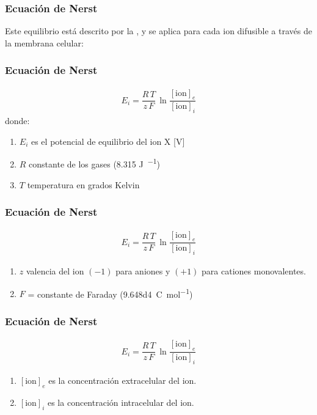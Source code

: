 \documentclass[14pt]{beamer}
\begin{document}
\begin{frame}
\frametitle{Ecuación de Nerst}
Este equilibrio está descrito por la , y se aplica para cada ion difusible a través de la membrana celular:
\end{frame}
\begin{frame}
\frametitle{Ecuación de Nerst}
\vspace*{-1cm}
\begin{align*}
E_{i} = \dfrac{R \, T}{z \, F} \, \ln \dfrac{\left[ \text{ion} \right]_{e}}{\left[ \text{ion} \right]_{i}}
\end{align*}
donde:
\begin{enumerate}[<+->]
\item $E_{i}$ es el potencial de equilibrio del ion X [V]
\item $R$ constante de los gases (\num{8.315} \unit{\joule\per{\kelvin\mol}})
\item $T$ temperatura en grados Kelvin
\seti
\end{enumerate}
\end{frame}
\begin{frame}
\frametitle{Ecuación de Nerst}
\vspace*{-1cm}
\begin{align*}
E_{i} = \dfrac{R \, T}{z \, F} \, \ln \dfrac{\left[ \text{ion} \right]_{e}}{\left[ \text{ion} \right]_{i}}
\end{align*}
\begin{enumerate}[<+->]
\conti
\item $z$ valencia del ion $(-1)$ para aniones y $(+1)$ para cationes monovalentes.
\item $F$ = constante de Faraday (\SI{9.648d4}{\coulomb\per\mol})
\seti
\end{enumerate}
\end{frame}
\begin{frame}
\frametitle{Ecuación de Nerst}
\vspace*{-1cm}
\begin{align*}
E_{i} = \dfrac{R \, T}{z \, F} \, \ln \dfrac{\left[ \text{ion} \right]_{e}}{\left[ \text{ion} \right]_{i}}
\end{align*}
\begin{enumerate}[<+->]
\conti
\item $\left[ \text{ion} \right]_{e}$ es la concentración extracelular del ion.
\item $\left[ \text{ion} \right]_{i}$ es la concentración intracelular del ion.
\end{enumerate}
\end{frame}
\end{document}
